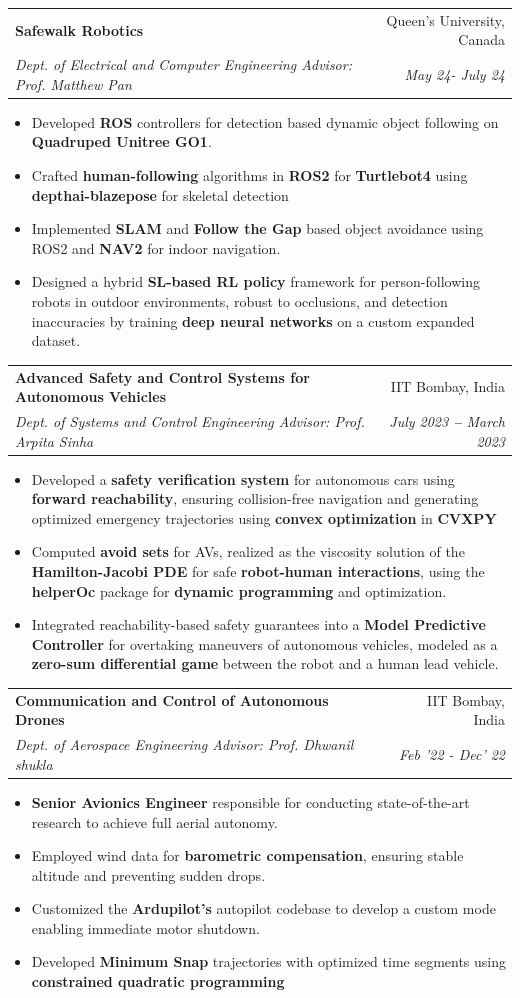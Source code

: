 \documentclass[letterpaper,11pt]{article}
\makeatletter
\newcommand{\resumeItem}[1]{
  \item\small{
    {#1 \vspace{-2pt}}
  }
}
\newcommand{\resumeSubheading}[4]{
  \vspace{-2pt}\item
    \begin{tabular*}{0.97\textwidth}[t]{l@{\extracolsep{\fill}}r}
      \textbf{#1} & #2 \\
      \textit{\small#3} & \textit{\small #4} \\
    \end{tabular*}\vspace{-7pt}
}
\newcommand{\resumeItemListStart}{\begin{itemize}}
\newcommand{\resumeItemListEnd}{\end{itemize}\vspace{-5pt}}
\makeatother
\begin{document}
    \resumeSubheading
      {Safewalk Robotics \href{https://github.com/prachitgupta/Person-follower/}{\textcolor{blue}\faGithub}}{Queen's University, Canada}
      {Dept. of Electrical and Computer Engineering \textbar \hspace{0.4mm}Advisor: Prof. Matthew Pan}{May 24- July 24}
        \resumeItemListStart
            \resumeItem{Developed \textbf{ROS }controllers for detection based dynamic object following on \textbf{Quadruped Unitree GO1}.}
            \resumeItem{Crafted \textbf{human-following} algorithms in \textbf{ROS2} for\textbf{ Turtlebot4} using \textbf{depthai-blazepose} for skeletal detection}
            \resumeItem{Implemented \textbf{SLAM} and \textbf{Follow the Gap} based object avoidance using ROS2 and \textbf{NAV2} for indoor navigation.}
            \resumeItem{Designed a hybrid \textbf{SL-based RL policy} framework for person-following robots in outdoor environments, robust to occlusions, and detection inaccuracies by training \textbf{deep neural networks} on a custom expanded dataset.}
        \resumeItemListEnd
    
    \resumeSubheading
      {Advanced Safety and Control Systems for Autonomous Vehicles \href{https://github.com/prachitgupta/Safe-control-Systems-for-AVs}{\textcolor{blue}\faGithub}}{IIT Bombay, India}
      {  Dept. of Systems and Control Engineering \textbar \hspace{0.4mm} Advisor: Prof. Arpita Sinha}{July 2023 \textbf{--} March 2023}
        \resumeItemListStart
            \resumeItem{Developed a\textbf{ safety verification system} for autonomous cars using \textbf{forward reachability}, ensuring collision-free navigation and generating optimized emergency trajectories using \textbf{convex optimization }in \textbf{CVXPY}}
            \resumeItem{Computed\textbf{ avoid sets} for AVs, realized as the viscosity solution of the\textbf{ Hamilton-Jacobi PDE} for safe
            \textbf{robot-human interactions}, using the \textbf{helperOc} package for \textbf{dynamic programming} and optimization.}
            \resumeItem{Integrated reachability-based safety guarantees into a \textbf{Model Predictive Controller} for overtaking maneuvers of autonomous vehicles, modeled as a \textbf{zero-sum differential game} between the robot and a human lead vehicle. }
        \resumeItemListEnd

    \resumeSubheading
      {Communication and Control of Autonomous Drones}{IIT Bombay, India}
      {  Dept. of Aerospace Engineering \textbar \hspace{0.4mm}Advisor: Prof. Dhwanil shukla}{Feb '22 - Dec' 22}
        \resumeItemListStart
            \resumeItem{\textbf{Senior Avionics Engineer} responsible for conducting state-of-the-art research to achieve full aerial autonomy. }
            \resumeItem{Employed wind data for \textbf{barometric compensation}, ensuring stable altitude and preventing sudden drops.}
            \resumeItem{Customized the \textbf{Ardupilot's }autopilot codebase to develop a custom mode enabling immediate motor shutdown. }
            \resumeItem{Developed\textbf{ Minimum Snap} trajectories with optimized time segments using \textbf{constrained quadratic programming}}
        \resumeItemListEnd
    
\end{document}
